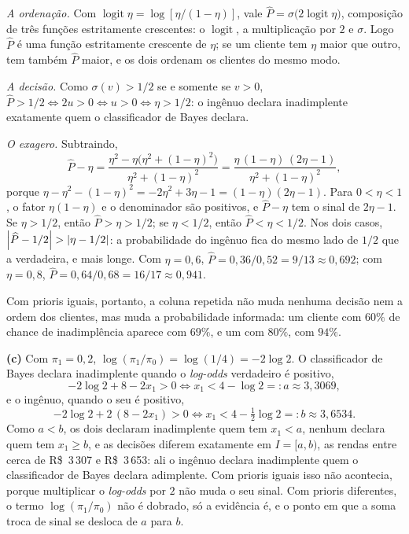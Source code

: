 \begin{solucao}
\emph{A ordenação.} Com $\operatorname{logit}\eta=\log[\eta/(1-\eta)]$, vale
$\widehat P=\sigma\big(2\operatorname{logit}\eta\big)$, composição de três funções
estritamente crescentes: o $\operatorname{logit}$, a multiplicação por $2$ e $\sigma$. Logo
$\widehat P$ é uma função estritamente crescente de $\eta$; se um cliente tem $\eta$ maior que
outro, tem também $\widehat P$ maior, e os dois ordenam os clientes do mesmo modo.

\emph{A decisão.} Como $\sigma(v)>1/2$ se e somente se $v>0$,
$\widehat P>1/2\iff 2u>0\iff u>0\iff\eta>1/2$: o ingênuo declara inadimplente exatamente quem
o classificador de Bayes declara.

\emph{O exagero.} Subtraindo,
\[
  \widehat P-\eta
  =\frac{\eta^2-\eta\big(\eta^2+(1-\eta)^2\big)}{\eta^2+(1-\eta)^2}
  =\frac{\eta\,(1-\eta)\,(2\eta-1)}{\eta^2+(1-\eta)^2},
\]
porque $\eta-\eta^2-(1-\eta)^2=-2\eta^2+3\eta-1=(1-\eta)(2\eta-1)$. Para $0<\eta<1$, o fator
$\eta(1-\eta)$ e o denominador são positivos, e $\widehat P-\eta$ tem o sinal de $2\eta-1$. Se
$\eta>1/2$, então $\widehat P>\eta>1/2$; se $\eta<1/2$, então $\widehat P<\eta<1/2$. Nos dois
casos, $\left\lvert \widehat P-1/2 \right\rvert>\left\lvert \eta-1/2 \right\rvert$: a probabilidade do ingênuo fica do mesmo lado de
$1/2$ que a verdadeira, e mais longe. Com $\eta=0{,}6$,
$\widehat P=0{,}36/0{,}52=9/13\approx0{,}692$; com $\eta=0{,}8$,
$\widehat P=0{,}64/0{,}68=16/17\approx0{,}941$.

Com prioris iguais, portanto, a coluna repetida não muda nenhuma decisão nem a ordem dos
clientes, mas muda a probabilidade informada: um cliente com $60\%$ de chance de
inadimplência aparece com $69\%$, e um com $80\%$, com $94\%$.

\smallskip
\textbf{(c)} Com $\pi_1=0{,}2$, $\log(\pi_1/\pi_0)=\log(1/4)=-2\log2$. O classificador de Bayes
declara inadimplente quando o \emph{log-odds} verdadeiro é positivo,
\[
  -2\log2+8-2x_1>0\iff x_1<4-\log2=:a\approx3{,}3069 ,
\]
e o ingênuo, quando o seu é positivo,
\[
  -2\log2+2\,(8-2x_1)>0\iff x_1<4-\tfrac12\log2=:b\approx3{,}6534 .
\]
Como $a<b$, os dois declaram inadimplente quem tem $x_1<a$, nenhum declara quem tem $x_1\ge b$,
e as decisões diferem exatamente em $I=[a,b)$, as rendas entre cerca de R\$~3\,307 e
R\$~3\,653: ali o ingênuo declara inadimplente quem o classificador de Bayes declara
adimplente. Com prioris iguais isso não acontecia, porque multiplicar o \emph{log-odds} por $2$
não muda o seu sinal. Com prioris diferentes, o termo $\log(\pi_1/\pi_0)$ não é dobrado, só a
evidência é, e o ponto em que a soma troca de sinal se desloca de $a$ para $b$.


\end{solucao}

